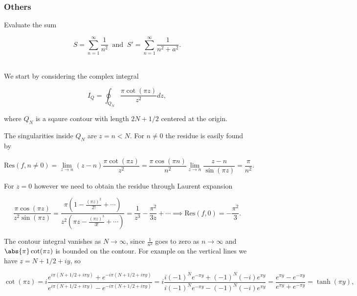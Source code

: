 \documentclass[english,a4paper,12pt]{report}
\begin{document}
\subsubsection{Others}

{Evaluate the sum

\begin{equation}
    S = \sum_{n=1}^{\infty} \frac{1}{n^2} ~\text { and }~ S' = \sum_{n=1}^{\infty} \frac{1}{n^2+a^2}. 
\end{equation}
~
}
{We start by considering the complex integral

\begin{equation}
    I_{Q} = \oint_{Q_{N} } \frac{\pi \cot (\pi z)}{z^2}  dz,
\end{equation}

where \(Q_{N} \) is a sqaure contour with length \(2N + 1/2\) centered at the origin.  

The singularities inside \(Q_{N} \) are \(z = n < N\). For \(n \neq 0\) the residue is easily found by 

\begin{equation}
    \text{Res}(f,n \neq 0) = \lim_{z \to n} (z-n)\frac{\pi \cot (\pi z)}{z^2} = \frac{\pi \cos (\pi n)}{n^2} \lim_{z \to n} \frac{z-n}{\sin (\pi z)} = \frac{\pi }{n^2}.   
\end{equation}

For \(z = 0\) however we need to obtain the residue through Laurent expansion

\begin{equation}
    \frac{\pi \cos (\pi z)}{z^2\sin (\pi z)} = \frac{\pi (1-\frac{(\pi z)^2}{2!} + \cdots )}{z^2(\pi z - \frac{(\pi z)^3 }{3!} + \cdots )} = \frac{1}{z^3 } - \frac{\pi ^2}{3z} + \cdots \implies \text{Res}(f,0) = - \frac{\pi ^2}{3}.      
\end{equation}

The contour integral vanishes as \(N \to \infty\), since \(\frac{1}{n^2} \) goes to zero as \(n \to \infty\) and \(\abs{\pi } \cot (\pi z)\) is bounded on the contour. For example on the vertical lines we have \(z = N+1/2+iy\), so 

\begin{equation}
    \cot (\pi z) = i \frac{e^{i\pi (N+1/2+i\pi y)} + e^{-i\pi (N+1/2+i\pi y)} }{e^{i\pi (N+1/2+i\pi y)} - e^{-i\pi (N+1/2+i\pi y)} } = i \frac{i(-1)^{N}e^{-\pi y} + (-1)^{N}(-i)e^{\pi y}}{i(-1)^{N}e^{-\pi y} - (-1)^{N}(-i)e^{\pi y}} = \frac{e^{\pi y} - e^{-\pi y} }{e^{\pi y} + e^{-\pi y} } = \tanh (\pi y),   
\end{equation}

}
\end{document}
